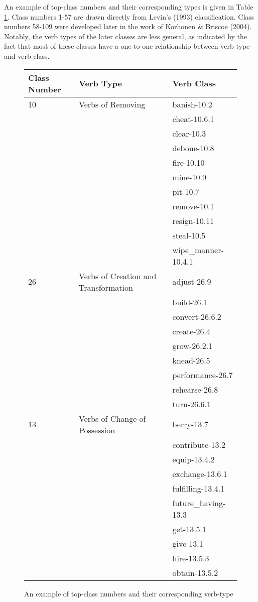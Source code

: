 An example of top-class numbers and their corresponding types is given in Table \ref{tb:vtype_example}. Class numbers 1-57 are drawn directly from Levin's (1993) classification. Class numbers 58-109 were developed later in the work of Korhonen \& Briscoe (2004). Notably, the verb types of the later classes are less general, as indicated by the fact that most of these classes have a one-to-one relationship between verb type and verb class.

\begin{figure}
\begingroup
\footnotesize
\centering
\begin{tabularx}{12cm}{l  l  l}
\hline
Class Number	&Verb Type	&Verb Class \\
\hline 
\hline
10&	Verbs of Removing		&banish-10.2 \\
&&cheat-10.6.1\\
&&clear-10.3\\
&&debone-10.8\\
&&fire-10.10\\
&&mine-10.9\\
&&pit-10.7\\
&&remove-10.1\\
&&resign-10.11\\
&&steal-10.5\\
&&wipe\_manner-10.4.1\\
\hline
26	&Verbs of Creation and Transformation	&adjust-26.9 \\
&&build-26.1 \\
&&convert-26.6.2\\
&&create-26.4\\
&&grow-26.2.1\\
&&knead-26.5\\
&&performance-26.7\\
&&rehearse-26.8\\
&&turn-26.6.1\\
\hline
13&	Verbs of Change of Possession	&berry-13.7 \\
&&contribute-13.2\\
&&equip-13.4.2\\
&&exchange-13.6.1\\
&&fulfilling-13.4.1\\
&&future\_having-13.3\\
&&get-13.5.1\\
&&give-13.1\\
&&hire-13.5.3\\
&&obtain-13.5.2\\
\hline
\end{tabularx}
\begin{TableCaption}
\caption{An example of top-class numbers and their corresponding verb-type\cite{verbnet_guidelines}}\label{tb:vtype_example}
\end{TableCaption}
\endgroup
\end{figure}
